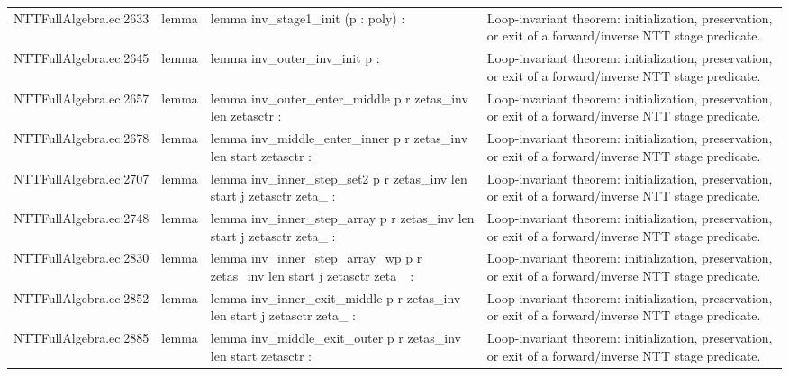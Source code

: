 \documentclass[10pt]{article}
\begin{document}
\begin{longtable}{L{0.11\textwidth}L{0.05\textwidth}L{0.38\textwidth}L{0.42\textwidth}}
NTTFullAlgebra.\allowbreak{}ec:\allowbreak{}2633 & lemma & {\ttfamily\scriptsize lemma inv\_stage1\_init (p : poly) :} & Loop-invariant theorem: initialization, preservation, or exit of a forward/inverse NTT stage predicate. \\
NTTFullAlgebra.\allowbreak{}ec:\allowbreak{}2645 & lemma & {\ttfamily\scriptsize lemma inv\_outer\_inv\_init p :} & Loop-invariant theorem: initialization, preservation, or exit of a forward/inverse NTT stage predicate. \\
NTTFullAlgebra.\allowbreak{}ec:\allowbreak{}2657 & lemma & {\ttfamily\scriptsize lemma inv\_outer\_enter\_middle p r zetas\_inv len zetasctr :} & Loop-invariant theorem: initialization, preservation, or exit of a forward/inverse NTT stage predicate. \\
NTTFullAlgebra.\allowbreak{}ec:\allowbreak{}2678 & lemma & {\ttfamily\scriptsize lemma inv\_middle\_enter\_inner p r zetas\_inv len start zetasctr :} & Loop-invariant theorem: initialization, preservation, or exit of a forward/inverse NTT stage predicate. \\
NTTFullAlgebra.\allowbreak{}ec:\allowbreak{}2707 & lemma & {\ttfamily\scriptsize lemma inv\_inner\_step\_set2 p r zetas\_inv len start j zetasctr zeta\_ :} & Loop-invariant theorem: initialization, preservation, or exit of a forward/inverse NTT stage predicate. \\
NTTFullAlgebra.\allowbreak{}ec:\allowbreak{}2748 & lemma & {\ttfamily\scriptsize lemma inv\_inner\_step\_array p r zetas\_inv len start j zetasctr zeta\_ :} & Loop-invariant theorem: initialization, preservation, or exit of a forward/inverse NTT stage predicate. \\
NTTFullAlgebra.\allowbreak{}ec:\allowbreak{}2830 & lemma & {\ttfamily\scriptsize lemma inv\_inner\_step\_array\_wp p r zetas\_inv len start j zetasctr zeta\_ :} & Loop-invariant theorem: initialization, preservation, or exit of a forward/inverse NTT stage predicate. \\
NTTFullAlgebra.\allowbreak{}ec:\allowbreak{}2852 & lemma & {\ttfamily\scriptsize lemma inv\_inner\_exit\_middle p r zetas\_inv len start j zetasctr zeta\_ :} & Loop-invariant theorem: initialization, preservation, or exit of a forward/inverse NTT stage predicate. \\
NTTFullAlgebra.\allowbreak{}ec:\allowbreak{}2885 & lemma & {\ttfamily\scriptsize lemma inv\_middle\_exit\_outer p r zetas\_inv len start zetasctr :} & Loop-invariant theorem: initialization, preservation, or exit of a forward/inverse NTT stage predicate. \\

\end{longtable}
\end{document}
